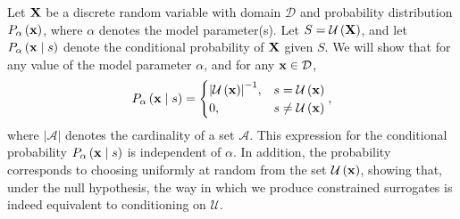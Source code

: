 \documentclass[%
prx,
reprint,
superscriptaddress,
nofootinbib,
 amsmath,amssymb,
 aps,
]{revtex4-2}
\begin{document}
Let ${\bf X}$ be a discrete random variable with domain $\mathcal{D}$ and probability distribution $P_{\alpha}\left({\bf x}\right)$, where $\alpha$ denotes the model parameter(s). Let $S = \mathcal{U} \left( {\bf X} \right)$, and let $P_{\alpha}\left({\bf x} \mid s\right)$ denote the conditional probability of ${\bf X}$ given $S$. We will show that for any value of the model parameter $\alpha$, and for any ${\bf x} \in \mathcal{D}$,
\begin{equation}
P_{\alpha}\left({\bf x} \mid s\right) = \begin{cases}{\left\lvert \mathcal{U}\left({\bf x}\right)\right\rvert}^{-1},&s = \mathcal{U}\left({\bf x}\right)\\
0,&s \neq \mathcal{U}\left({\bf x}\right)
\end{cases},\notag
\end{equation}
where $\left\lvert \mathcal{A} \right\rvert$ denotes the cardinality of a set $\mathcal{A}$. This expression for the conditional probability $P_{\alpha}\left({\bf x} \mid s\right)$ is independent of $\alpha$. In addition, the probability corresponds to choosing uniformly at random from the set $\mathcal{U}\left({\bf x}\right)$, showing that, under the null hypothesis, the way in which we produce constrained surrogates is indeed equivalent to conditioning on $\mathcal{U}$.
\end{document}
